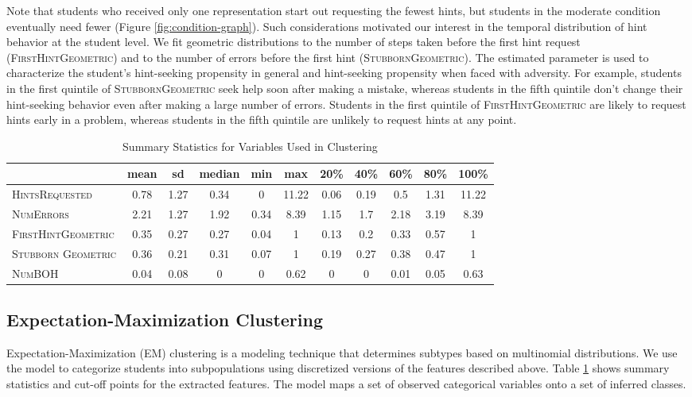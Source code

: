 \documentclass{edm_template}
\newcommand{\ftr}[1]{\textsc{#1}}
\begin{document}
Note that students who received only one representation start out requesting the fewest hints, but students in the moderate condition eventually need fewer  (Figure \ref{fig:condition-graph}). Such considerations motivated our interest in the temporal distribution of hint behavior at the student level. We fit geometric distributions to the number of steps taken before the first hint request (\ftr{FirstHintGeometric}) and to the number of errors before the first hint (\ftr{StubbornGeometric}). The estimated parameter is used to characterize the student's hint-seeking propensity in general and hint-seeking propensity when faced with adversity. For example, students in the first quintile of \ftr{StubbornGeometric} seek help soon after making a mistake, whereas students in the fifth quintile don't change their hint-seeking behavior even after making a large number of errors. Students in the first quintile of \ftr{FirstHintGeometric} are likely to request hints early in a problem, whereas students in the fifth quintile are unlikely to request hints at any point.
\begin{table}[htbp]
\caption{Summary Statistics for Variables Used in Clustering}
\begin{center}
\begin{tabular}{| l || c | c || c | c | c || c | c | c | c | c |}
\hline
&mean& sd&median&min&max&20\%&40\%&60\%&	80\%&100\%\\ \hline \hline
\ftr{HintsRequested}&0.78&1.27&0.34&0&11.22&0.06&0.19&0.5&1.31&11.22\\ \hline
\ftr{NumErrors}&2.21&1.27&1.92&0.34&8.39&1.15&1.7&2.18&3.19&8.39\\ \hline 
\ftr{FirstHintGeometric}&0.35&0.27&0.27&0.04&1&0.13&0.2&0.33&0.57&1\\ \hline
\ftr{Stubborn Geometric}&0.36&0.21&0.31&0.07&1&0.19&0.27&0.38&0.47&1\\ \hline
\ftr{NumBOH}&0.04&0.08&0&0&0.62&0&0&0.01&0.05&0.63\\ \hline
 \end{tabular}
\end{center}
\label{tab:sumstats}
\end{table}

\subsection{Expectation-Maximization Clustering}
\label{sec:EM-clust}

Expectation-Maximization (EM) clustering is a modeling technique that determines subtypes based on multinomial distributions. We use the model to categorize students into subpopulations using discretized versions of the features described above. Table \ref{tab:sumstats} shows summary statistics and cut-off points for the extracted features. The model maps a set of observed categorical variables onto a set of inferred classes. 
\end{document}
